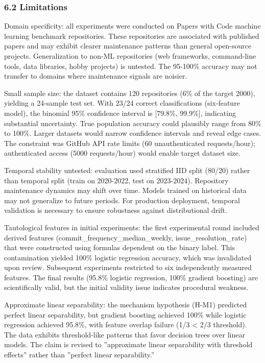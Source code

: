\subsubsection{6.2 Limitations}

Domain specificity: all experiments were conducted on Papers with Code machine learning benchmark repositories. These repositories are associated with published papers and may exhibit clearer maintenance patterns than general open-source projects. Generalization to non-ML repositories (web frameworks, command-line tools, data libraries, hobby projects) is untested. The 95-100\% accuracy may not transfer to domains where maintenance signals are noisier.

Small sample size: the dataset contains 120 repositories (6\% of the target 2000), yielding a 24-sample test set. With 23/24 correct classifications (six-feature model), the binomial 95\% confidence interval is [79.8\%, 99.9\%], indicating substantial uncertainty. True population accuracy could plausibly range from 80\% to 100\%. Larger datasets would narrow confidence intervals and reveal edge cases. The constraint was GitHub API rate limits (60 unauthenticated requests/hour); authenticated access (5000 requests/hour) would enable target dataset size.

Temporal stability untested: evaluation used stratified IID split (80/20) rather than temporal split (train on 2020-2022, test on 2023-2024). Repository maintenance dynamics may shift over time. Models trained on historical data may not generalize to future periods. For production deployment, temporal validation is necessary to ensure robustness against distributional drift.

Tautological features in initial experiments: the first experimental round included derived features (commit\_frequency\_median\_weekly, issue\_resolution\_rate) that were constructed using formulas dependent on the binary label. This contamination yielded 100\% logistic regression accuracy, which was invalidated upon review. Subsequent experiments restricted to six independently measured features. The final results (95.8\% logistic regression, 100\% gradient boosting) are scientifically valid, but the initial validity issue indicates procedural weakness.

Approximate linear separability: the mechanism hypothesis (H-M1) predicted perfect linear separability, but gradient boosting achieved 100\% while logistic regression achieved 95.8\%, with feature overlap failure (1/3 < 2/3 threshold). The data exhibits threshold-like patterns that favor decision trees over linear models. The claim is revised to ''approximate linear separability with threshold effects'' rather than ''perfect linear separability.''

